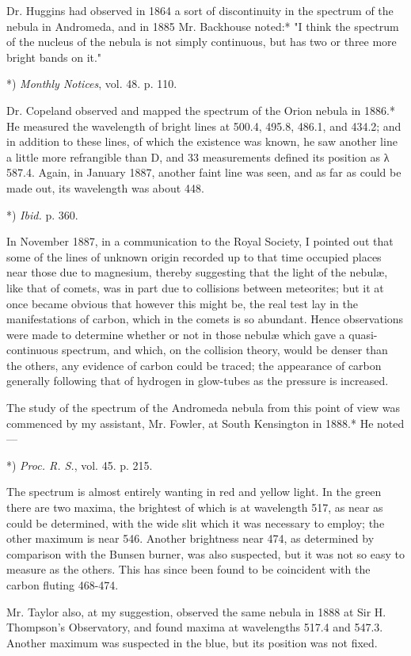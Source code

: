 \documentclass[a4paper, 12pt, oneside, polutonikogreek, english]{article}
\begin{document}
Dr. Huggins had observed in 1864 a sort of discontinuity in the spectrum of the nebula in Andromeda, and in 1885 Mr. Backhouse noted:* "I think the spectrum of the nucleus of the nebula is not simply continuous, but has two or three more bright bands on it."

*) \emph{Monthly Notices}, vol. 48. p. 110.

Dr. Copeland observed and mapped the spectrum of the Orion nebula in 1886.* He measured the wavelength of bright lines at 500.4, 495.8, 486.1, and 434.2; and in addition to these lines, of which the existence was known, he saw another line a little more refrangible than D, and 33 measurements defined its position as λ 587.4. Again, in January 1887, another faint line was seen, and as far as could be made out, its wavelength was about 448.

*) \emph{Ibid.} p. 360.

In November 1887, in a communication to the Royal Society, I pointed out that some of the lines of unknown origin recorded up to that time occupied places near those due to magnesium, thereby suggesting that the light of the nebulæ, like that of comets, was in part due to collisions between meteorites; but it at once became obvious that however this might be, the real test lay in the manifestations of carbon, which in the comets is so abundant. Hence observations were made to determine whether or not in those nebulæ which gave a quasi-continuous spectrum, and which, on the collision theory, would be denser than the others, any evidence of carbon could be traced; the appearance of carbon generally following that of hydrogen in glow-tubes as the pressure is increased.

The study of the spectrum of the Andromeda nebula from this point of view was commenced by my assistant, Mr. Fowler, at South Kensington in 1888.* He noted ---

*) \emph{Proc. R. S.}, vol. 45. p. 215.

The spectrum is almost entirely wanting in red and yellow light. In the green there are two maxima, the brightest of which is at wavelength 517, as near as could be determined, with the wide slit which it was necessary to employ; the other maximum is near 546. Another brightness near 474, as determined by comparison with the Bunsen burner, was also suspected, but it was not so easy to measure as the others. This has since been found to be coincident with the carbon fluting 468-474.

Mr. Taylor also, at my suggestion, observed the same nebula in 1888 at Sir H. Thompson's Observatory, and found maxima at wavelengths 517.4 and 547.3. Another maximum was suspected in the blue, but its position was not fixed.
\end{document}
